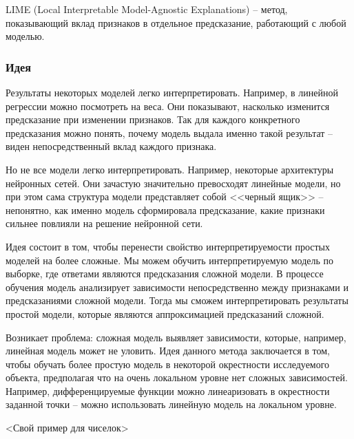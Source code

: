 LIME (Local Interpretable Model-Agnostic Explanations) -- метод, показывающий вклад признаков в отдельное предсказание, работающий с любой моделью.

\subsubsection{Идея}
Результаты некоторых моделей легко интерпретировать. Например, в линейной регрессии можно посмотреть на веса. Они показывают, насколько изменится предсказание при изменении признаков. Так для каждого конкретного предсказания можно понять, почему модель выдала именно такой результат -- виден непосредственный вклад каждого признака.

Но не все модели легко интерпретировать. Например, некоторые архитектуры нейронных сетей. Они зачастую значительно превосходят линейные модели, но при этом сама структура модели представляет собой <<черный ящик>> -- непонятно, как именно модель сформировала предсказание, какие признаки сильнее повлияли на решение нейронной сети.

Идея состоит в том, чтобы перенести свойство интерпретируемости простых моделей на более сложные. Мы можем обучить интерпретируемую модель по выборке, где ответами являются предсказания сложной модели. В процессе обучения модель анализирует зависимости непосредственно между признаками и предсказаниями сложной модели. Тогда мы сможем интерпретировать результаты простой модели, которые являются аппроксимацией предсказаний сложной.

Возникает проблема: сложная модель выявляет зависимости, которые, например, линейная модель может не уловить. Идея данного метода заключается в том, чтобы обучать более простую модель в некоторой окрестности исследуемого объекта, предполагая что на очень локальном уровне нет сложных зависимостей. Например, дифференцируемые функции можно линеаризовать в окрестности заданной точки -- можно использовать линейную модель на локальном уровне.


<Свой пример для чиселок>